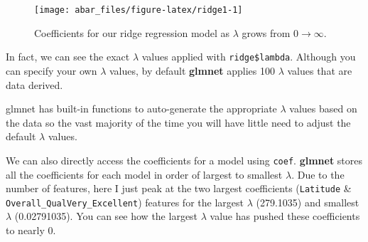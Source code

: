 \documentclass[]{book}
\newenvironment{Shaded}{\begin{snugshade}}{\end{snugshade}}
\newcommand{\CommentTok}[1]{\textcolor[rgb]{0.56,0.35,0.01}{\textit{#1}}}
\newcommand{\DecValTok}[1]{\textcolor[rgb]{0.00,0.00,0.81}{#1}}
\newcommand{\KeywordTok}[1]{\textcolor[rgb]{0.13,0.29,0.53}{\textbf{#1}}}
\newcommand{\NormalTok}[1]{#1}
\newcommand{\OperatorTok}[1]{\textcolor[rgb]{0.81,0.36,0.00}{\textbf{#1}}}
\newcommand{\StringTok}[1]{\textcolor[rgb]{0.31,0.60,0.02}{#1}}
\theoremstyle{definition}
\theoremstyle{definition}
\theoremstyle{definition}
\theoremstyle{remark}
\begin{document}
\begin{figure}

{\centering \texttt{[image: abar\_files/figure-latex/ridge1-1]} 

}

\caption{Coefficients for our ridge regression model as $\lambda$ grows from  $0 \rightarrow \infty$.}\label{fig:ridge1}
\end{figure}

In fact, we can see the exact \(\lambda\) values applied with
\texttt{ridge\$lambda}. Although you can specify your own \(\lambda\)
values, by default \textbf{glmnet} applies 100 \(\lambda\) values that
are data derived.

\begin{tip}
glmnet has built-in functions to auto-generate the appropriate
\(\lambda\) values based on the data so the vast majority of the time
you will have little need to adjust the default \(\lambda\) values.
\end{tip}

We can also directly access the coefficients for a model using
\texttt{coef}. \textbf{glmnet} stores all the coefficients for each
model in order of largest to smallest \(\lambda\). Due to the number of
features, here I just peak at the two largest coefficients
(\texttt{Latitude} \& \texttt{Overall\_QualVery\_Excellent}) features
for the largest \(\lambda\) (279.1035) and smallest \(\lambda\)
(0.02791035). You can see how the largest \(\lambda\) value has pushed
these coefficients to nearly 0.

\begin{Shaded}
\end{Shaded}
\end{document}
